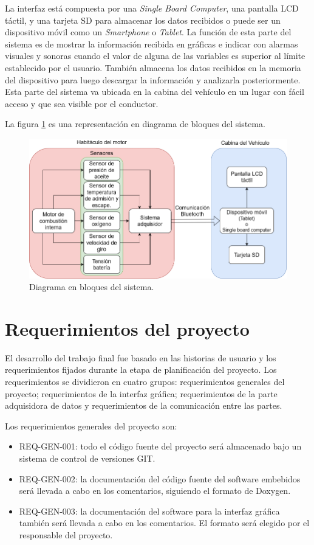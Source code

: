 La interfaz está compuesta por una \textit{Single Board Computer}, una pantalla LCD táctil, y una tarjeta SD para almacenar los datos recibidos o puede ser un dispositivo móvil como un \textit{Smartphone} o \textit{Tablet}. La función de esta parte del sistema es de mostrar la información recibida en gráficas e indicar con alarmas visuales y sonoras cuando el valor de alguna de las variables es superior al límite establecido por el usuario. También almacena los datos recibidos en la memoria del dispositivo para luego descargar la información y analizarla posteriormente. Esta parte del sistema va ubicada en la cabina del vehículo en un lugar con fácil acceso y que sea visible por el conductor.

La figura \ref{fig:diagrama-de-bloques} es una representación en diagrama de bloques del sistema.

\begin{figure}[htpb]
\centering
\includegraphics[width=.9\textwidth]{./Figures/diagrama-proyecto.png}
\caption{Diagrama en bloques del sistema.}
\label{fig:diagrama-de-bloques}
\end{figure}

\section{Requerimientos del proyecto}

El desarrollo del trabajo final fue basado en las historias de usuario y los requerimientos fijados durante la etapa de planificación del proyecto. Los requerimientos se dividieron en cuatro grupos: requerimientos generales del proyecto; requerimientos de la interfaz gráfica; requerimientos de la parte adquisidora de datos y requerimientos de la comunicación entre las partes.

Los requerimientos generales del proyecto son:
\begin{itemize}
\item REQ-GEN-001: todo el código fuente del proyecto será almacenado bajo un sistema de control de versiones GIT.
\item REQ-GEN-002: la documentación del código fuente del software embebidos será llevada a cabo en los comentarios, siguiendo el formato de Doxygen.
\item REQ-GEN-003: la documentación del software para la interfaz gráfica también será llevada a cabo en los comentarios. El formato será elegido por el responsable del proyecto.
\end{itemize}


